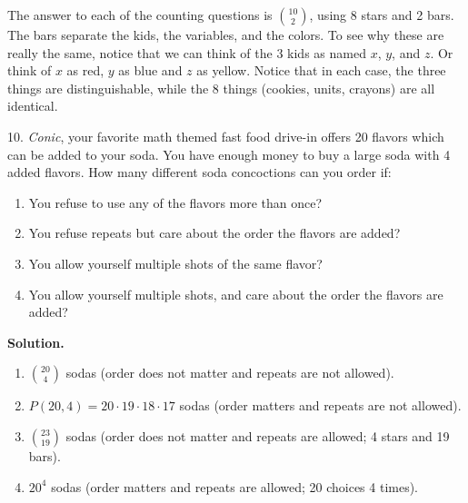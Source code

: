 \documentclass[10pt,]{book}
\theoremstyle{plain}
\theoremstyle{definition}
\theoremstyle{definition}
\theoremstyle{definition}
\numberwithin{equation}{section}
\begin{document}
\begin{exerciselist}
The answer to each of the counting questions is \({10 \choose 2}\), using 8 stars and 2 bars. The bars separate the kids, the variables, and the colors. To see why these are really the same, notice that we can think of the 3 kids as named \(x\), \(y\), and \(z\). Or think of \(x\) as red, \(y\) as blue and \(z\) as yellow. Notice that in each case, the three things are distinguishable, while the 8 things (cookies, units, crayons) are all identical.
%
\item[10.]\hypertarget{exercise-91}{}
\emph{Conic}, your favorite math themed fast food drive-in offers 20 flavors which can be added to your soda. You have enough money to buy a large soda with 4 added flavors. How many different soda concoctions can you order if:
%
\leavevmode%
\begin{enumerate}[label=(\alph*)]
\item\hypertarget{li-601}{}
You refuse to use any of the flavors more than once?
%
\item\hypertarget{li-602}{}
You refuse repeats but care about the order the flavors are added?
%
\item\hypertarget{li-603}{}
You allow yourself multiple shots of the same flavor?
%
\item\hypertarget{li-604}{}
You allow yourself multiple shots, and care about the order the flavors are added?
%
\end{enumerate}
\par\smallskip
\par\smallskip
\noindent\textbf{Solution.}\hypertarget{solution-131}{}\quad
\leavevmode%
\begin{enumerate}[label=(\alph*)]
\item\hypertarget{li-605}{}\({20 \choose 4}\) sodas (order does not matter and repeats are not allowed).%
\item\hypertarget{li-606}{}\(P(20, 4) = 20\cdot 19\cdot 18 \cdot 17\) sodas (order matters and repeats are not allowed).%
\item\hypertarget{li-607}{}\({23 \choose 19}\) sodas (order does not matter and repeats are allowed; 4 stars and 19 bars).%
\item\hypertarget{li-608}{}\(20^4\) sodas (order matters and repeats are allowed; 20 choices 4 times).%
\end{enumerate}
\end{exerciselist}
\typeout{************************************************}
\typeout{************************************************}
\end{document}

